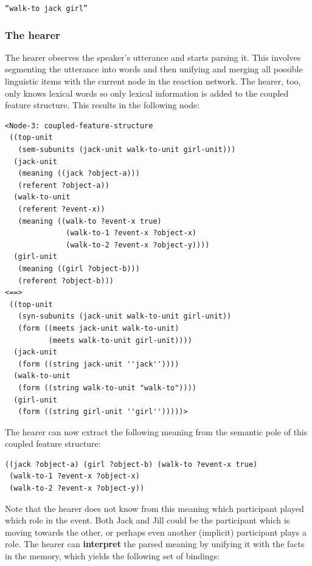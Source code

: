 \ea
\texttt{``walk-to jack girl''}
\z

\subsubsection{The hearer}
 The hearer observes the speaker's utterance and starts parsing it. This involves segmenting the utterance into words and then unifying and merging all possible linguistic items with the current node in the reaction network. The hearer, too, only knows lexical words so only lexical information is added to the coupled feature structure. This results in the following node:


\ea
\begin{lstlisting}
<Node-3: coupled-feature-structure
 ((top-unit
   (sem-subunits (jack-unit walk-to-unit girl-unit)))
  (jack-unit
   (meaning ((jack ?object-a)))
   (referent ?object-a))
  (walk-to-unit
   (referent ?event-x))
   (meaning ((walk-to ?event-x true)
              (walk-to-1 ?event-x ?object-x)
              (walk-to-2 ?event-x ?object-y))))
  (girl-unit
   (meaning ((girl ?object-b)))
   (referent ?object-b)))
<==>
 ((top-unit
   (syn-subunits (jack-unit walk-to-unit girl-unit))
   (form ((meets jack-unit walk-to-unit) 
          (meets walk-to-unit girl-unit))))
  (jack-unit
   (form ((string jack-unit ''jack''))))
  (walk-to-unit
   (form ((string walk-to-unit "walk-to"))))
  (girl-unit
   (form ((string girl-unit ''girl'')))))>
\end{lstlisting}
\z


The hearer can now extract the following meaning from the semantic pole of this coupled feature structure:

\ea
\begin{lstlisting}
((jack ?object-a) (girl ?object-b) (walk-to ?event-x true)
 (walk-to-1 ?event-x ?object-x) 
 (walk-to-2 ?event-x ?object-y))
\end{lstlisting}
\z

Note that the hearer does not know from this meaning which participant played which role in the event. Both Jack and Jill could be the participant which is moving towards the other, or perhaps even another (implicit) participant plays a role. The hearer can {\bfseries interpret} the parsed meaning by unifying it with the facts in the memory, which yields the following set of bindings:

